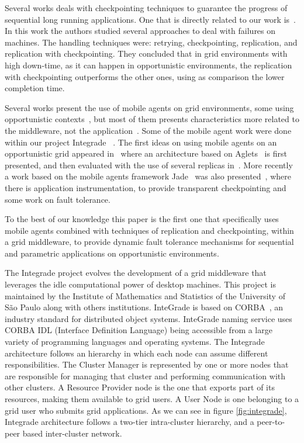 \documentclass[times, 10pt, twocolumn]{article}
\begin{document}
Several works deals with checkpointing techniques to guarantee the progress of
sequential long running applications. One that is directly related to our
work is~\cite{hwang03}. In this work the authors studied several approaches to
deal with failures on machines. The handling techniques were: retrying, checkpointing,
replication, and replication with checkpointing. They concluded that in grid
environments with high down-time, as it can happen in opportunistic environments,
the replication with checkpointing outperforms the other ones, using as comparison
the lower completion time.

Several works present the use of mobile agents on grid environments, some using
opportunistic contexts~\cite{fukuda03}, but most of them presents characteristics
more related to the middleware, not the
application~\cite{cao02,cao01,loke03,martino04}. Some of the mobile agent work
were done within our project Integrade~ \cite{goldchleger04}. The first ideas on
using mobile agents on an opportunistic grid appeared in~\cite{barbosa04} where
an architecture based on Aglets~\cite{aglets} is first presented, and then
evaluated with the use of several replicas in~\cite{barbosa05}. More recently a
work based on the mobile agents framework Jade~\cite{jade} was also
presented~\cite{lopes05,lopes06_2}, where there is application instrumentation, to
provide transparent checkpointing and some work on fault tolerance.

To the best of our knowledge this paper is the first one that
specifically uses mobile agents combined with techniques of
replication and checkpointing, within a grid middleware, to provide
dynamic fault tolerance mechanisms for sequential and parametric applications
on opportunistic environments.


\label{sec:arch}

The Integrade project evolves the development of a grid middleware that
leverages the idle computational power of desktop machines. This project is
maintained by the Institute of Mathematics and Statistics of the University of
S\~{a}o Paulo along with others institutions. InteGrade is based on
CORBA~\cite{vinoski97}, an industry standard for distributed object systems. InteGrade
naming service uses CORBA IDL (Interface Definition Language) being accessible
from a large variety of programming languages and operating systems. The
Integrade architecture follows an hierarchy in which each node can assume
different responsibilities. The Cluster Manager is represented by one or more
nodes that are responsible for managing that cluster and performing
communication with other clusters. A Resource Provider node is the one that
exports part of its resources, making them available to grid users. A User Node
is one belonging to a grid user who submits grid applications. As we can see in
figure \ref{fig:integrade}, Integrade architecture follows a two-tier
intra-cluster hierarchy, and a peer-to-peer based inter-cluster network.
\end{document}
